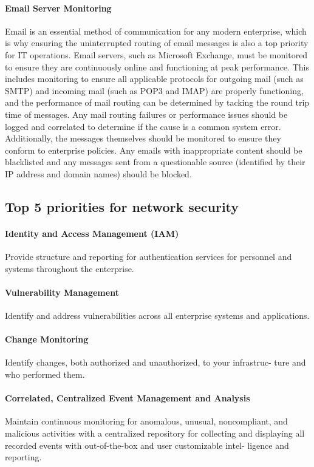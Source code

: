 \documentclass[8pt]{extarticle}
\begin{document}
\begin{multicols}{3}
\paragraph{Email Server Monitoring}
Email is an essential method of communication for any modern enterprise, which is why ensuring the
uninterrupted routing of email messages is also a top priority for IT operations. Email servers, such as
Microsoft Exchange, must be monitored to ensure they are continuously online and functioning at peak
performance. This includes monitoring to ensure all applicable protocols for outgoing mail (such as
SMTP) and incoming mail (such as POP3 and IMAP) are properly functioning, and the performance
of mail routing can be determined by tacking the round trip time of messages. Any mail routing failures
or performance issues should be logged and correlated to determine if the cause is a common system
error. Additionally, the messages themselves should be monitored to ensure they conform to enterprise
policies. Any emails with inappropriate content should be blacklisted and any messages sent from a
questionable source (identified by their IP address and domain names) should be blocked.

\subsection{Top 5 priorities for network security}
\paragraph{Identity and Access Management (IAM)}
Provide structure and reporting for authentication services
for personnel and systems throughout the enterprise.
\paragraph{Vulnerability Management} Identify and address vulnerabilities across all enterprise systems
and applications.
\paragraph{Change Monitoring} Identify changes, both authorized and unauthorized, to your infrastruc-
ture and who performed them.
\paragraph{Correlated, Centralized Event Management and Analysis} Maintain continuous monitoring
for anomalous, unusual, noncompliant, and malicious activities with a centralized repository for
collecting and displaying all recorded events with out-of-the-box and user customizable intel-
ligence and reporting.

\end{multicols}
\end{document}

